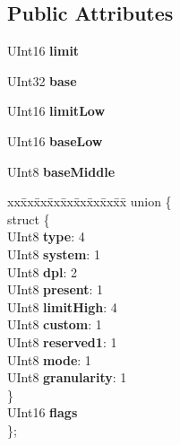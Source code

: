 \subsection*{Public Attributes}
\begin{DoxyCompactItemize}
\item 
\mbox{\label{struct____attribute_____a4a3519462297ae621fe8b97ba3e8155a}} 
U\+Int16 {\bfseries limit}
\item 
\mbox{\label{struct____attribute_____a3b527458171963f588a03262db54c506}} 
U\+Int32 {\bfseries base}
\item 
\mbox{\label{struct____attribute_____a497e279b15e4c62991fee657fe4c5ec6}} 
U\+Int16 {\bfseries limit\+Low}
\item 
\mbox{\label{struct____attribute_____a5a296701ea85e7ee6cb8d2faf442d09c}} 
U\+Int16 {\bfseries base\+Low}
\item 
\mbox{\label{struct____attribute_____abd77ffcbd93adcf927bba1b5d2b8cca4}} 
U\+Int8 {\bfseries base\+Middle}
\item 
\mbox{\label{struct____attribute_____ac46ccef070e76ccd90ed7ffa8d65512d}} 
\begin{tabbing}
xx\=xx\=xx\=xx\=xx\=xx\=xx\=xx\=xx\=\kill
union \{\\
\mbox{\label{union____attribute_____1_1_0D1_ad52c3e849d4980a5dacaf1238201b059}} 
\>struct \{\\
\>\>UInt8 {\bfseries type}: 4\\
\>\>UInt8 {\bfseries system}: 1\\
\>\>UInt8 {\bfseries dpl}: 2\\
\>\>UInt8 {\bfseries present}: 1\\
\>\>UInt8 {\bfseries limitHigh}: 4\\
\>\>UInt8 {\bfseries custom}: 1\\
\>\>UInt8 {\bfseries reserved1}: 1\\
\>\>UInt8 {\bfseries mode}: 1\\
\>\>UInt8 {\bfseries granularity}: 1\\
\>\} \\
\>UInt16 {\bfseries flags}\\
\}; \\


\end{tabbing}
\end{DoxyCompactItemize}

